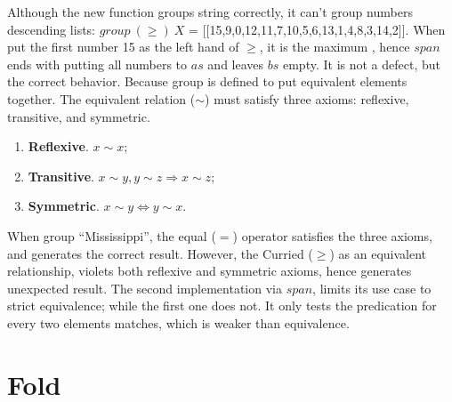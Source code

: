 \documentclass[b5paper]{article}
\begin{document}
Although the new function groups string correctly, it can't group numbers descending lists: $\textit{group}\ (\geq)\ X$ = [[15,9,0,12,11,7,10,5,6,13,1,4,8,3,14,2]]. When put the first number 15 as the left hand of $\geq$, it is the maximum , hence $span$ ends with putting all numbers to $as$ and leaves $bs$ empty. It is not a defect, but the correct behavior. Because group is defined to put equivalent elements together. The equivalent relation ($\sim$) must satisfy three axioms: reflexive, transitive, and symmetric.

\begin{enumerate}
\item \textbf{Reflexive}. $x \sim x$;
\item \textbf{Transitive}. $x \sim y, y \sim z \Rightarrow x \sim z$;
\item \textbf{Symmetric}. $x \sim y \Leftrightarrow y \sim x$.
\end{enumerate}

When group ``Mississippi'', the equal ($=$) operator satisfies the three axioms, and generates the correct result. However, the Curried ($\geq$) as an equivalent relationship, violets both reflexive and symmetric axioms, hence generates unexpected result. The second implementation via $span$, limits its use case to strict equivalence; while the first one does not. It only tests the predication for every two elements matches, which is weaker than equivalence.

\begin{Exercise}
\end{Exercise}

\section{Fold}
\label{sec:fold}
  
\end{document}
